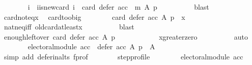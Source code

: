 \begin{isabellebody}
\ \ \ \ \ \ \isamarkupfalse%
\ i\ \ i{\isacharunderscore}{\kern0pt}is{\isacharunderscore}{\kern0pt}new{\isacharunderscore}{\kern0pt}card{\isacharcolon}{\kern0pt}\ {\isachardoublequoteopen}i\ {\isacharequal}{\kern0pt}\ card\ {\isacharparenleft}{\kern0pt}defer\ {\isacharparenleft}{\kern0pt}acc\ {\isasymtriangleright}\ m{\isacharparenright}{\kern0pt}\ A\ p{\isacharparenright}{\kern0pt}{\isachardoublequoteclose}\isanewline
\ \ \ \ \ \ \ \ \isamarkupfalse%
\ blast\isanewline
\ \ \ \ \ \ \isamarkupfalse%
\ card{\isacharunderscore}{\kern0pt}not{\isacharunderscore}{\kern0pt}eq{\isacharunderscore}{\kern0pt}x\ \isamarkupfalse%
\ card{\isacharunderscore}{\kern0pt}too{\isacharunderscore}{\kern0pt}big{\isacharcolon}{\kern0pt}\isanewline
\ \ \ \ \ \ \ \ {\isachardoublequoteopen}card\ {\isacharparenleft}{\kern0pt}defer\ acc\ A\ p{\isacharparenright}{\kern0pt}\ {\isachargreater}{\kern0pt}\ x{\isachardoublequoteclose}\isanewline
\ \ \ \ \ \ \ \ \isamarkupfalse%
\ nat{\isacharunderscore}{\kern0pt}neq{\isacharunderscore}{\kern0pt}iff\ old{\isacharunderscore}{\kern0pt}card{\isacharunderscore}{\kern0pt}at{\isacharunderscore}{\kern0pt}least{\isacharunderscore}{\kern0pt}x\isanewline
\ \ \ \ \ \ \ \ \isamarkupfalse%
\ blast\isanewline
\ \ \ \ \ \ \isamarkupfalse%
\ enough{\isacharunderscore}{\kern0pt}leftover{\isacharcolon}{\kern0pt}\ {\isachardoublequoteopen}card\ {\isacharparenleft}{\kern0pt}defer\ acc\ A\ p{\isacharparenright}{\kern0pt}\ {\isachargreater}{\kern0pt}\ {}{\isachardoublequoteclose}\isanewline
\ \ \ \ \ \ \ \ \isamarkupfalse%
\ x{\isacharunderscore}{\kern0pt}greater{\isacharunderscore}{\kern0pt}zero\isanewline
\ \ \ \ \ \ \ \ \isamarkupfalse%
\ auto\isanewline
\ \ \ \ \ \ \isamarkupfalse%
\ {\isachardoublequoteopen}electoral{\isacharunderscore}{\kern0pt}module\ acc\ {\isasymlongrightarrow}\ {\isacharparenleft}{\kern0pt}defer\ acc\ A\ p{\isacharparenright}{\kern0pt}\ {\isasymsubseteq}\ A{\isachardoublequoteclose}\isanewline
\ \ \ \ \ \ \ \ \isamarkupfalse%
\ {\isacharparenleft}{\kern0pt}simp\ add{\isacharcolon}{\kern0pt}\ defer{\isacharunderscore}{\kern0pt}in{\isacharunderscore}{\kern0pt}alts\ f{\isacharunderscore}{\kern0pt}prof{\isacharparenright}{\kern0pt}\isanewline
\ \ \ \ \ \ \isamarkupfalse%
\ step{\isacharunderscore}{\kern0pt}profile{\isacharcolon}{\kern0pt}\isanewline
\ \ \ \ \ \ \ \ {\isachardoublequoteopen}electoral{\isacharunderscore}{\kern0pt}module\ acc\ {\isasymlongrightarrow}\isanewline

\end{isabellebody}

